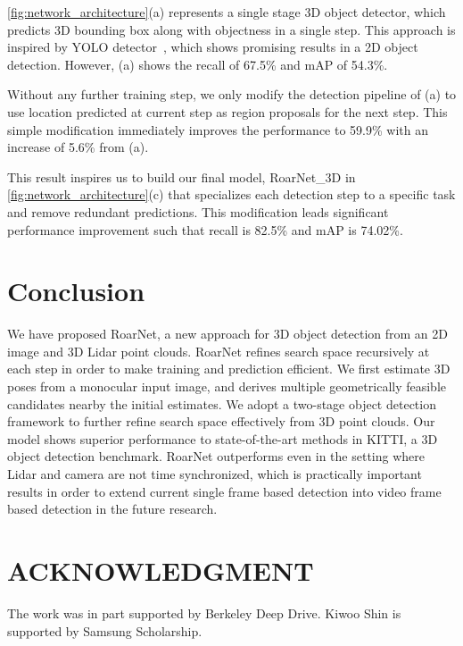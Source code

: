 \documentclass[letterpaper, 10 pt, conference]{ieeeconf}
\begin{document}
\cref{fig:network_architecture}(a) represents a single stage 3D object detector, which predicts 3D bounding box along with objectness in a single step. This approach is inspired by YOLO detector~\cite{redmon2016you,redmon2017yolo9000}, which shows promising results in a 2D object detection. However, (a) shows the recall of 67.5\% and mAP of 54.3\%.

Without any further training step, we only modify the detection pipeline of (a) to use location predicted at current step as region proposals for the next step. This simple modification immediately improves the performance to 59.9\% with an increase of 5.6\% from (a).

This result inspires us to build our final model, RoarNet\_3D in \cref{fig:network_architecture}(c) that specializes each detection step to a specific task and remove redundant predictions. This modification leads significant performance improvement such that recall is 82.5\% and mAP is 74.02\%.


\section{Conclusion}

We have proposed RoarNet, a new approach for 3D object detection from an 2D image and 3D Lidar point clouds. RoarNet refines search space recursively at each step in order to make training and prediction efficient. We first estimate 3D poses from a monocular input image, and derives multiple geometrically feasible candidates nearby the initial estimates. We adopt a two-stage object detection framework to further refine search space effectively from 3D point clouds. Our model shows superior performance to state-of-the-art methods in KITTI, a 3D object detection benchmark. RoarNet outperforms even in the setting where Lidar and camera are not time synchronized, which is practically important results in order to extend current single frame based detection into video frame based detection in the future research.


\section*{ACKNOWLEDGMENT}
The work was in part supported by Berkeley Deep Drive. Kiwoo Shin is supported by Samsung Scholarship.

\newpage



\end{document}
